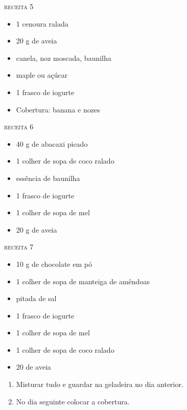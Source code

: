 {\begin{multicols}{2}
\textsc{receita 5}
\begin{itemize}
    \item 1 cenoura ralada
    \item 20 g de aveia
    \item canela, noz moscada, baunilha
    \item maple ou açúcar
    \item 1 frasco de iogurte
    \item Cobertura: banana e nozes
\end{itemize}

\textsc{receita 6}
\begin{itemize}
    \item 40 g de abacaxi picado
    \item 1 colher de sopa de coco ralado
    \item essência de baunilha
    \item 1 frasco de iogurte
    \item 1 colher de sopa de mel
    \item 20 g de aveia
\end{itemize}

\textsc{receita 7}
\begin{itemize}
    \item 10 g de chocolate em pó
    \item 1 colher de sopa de manteiga de amêndoas
    \item pitada de sal
    \item 1 frasco de iogurte
    \item 1 colher de sopa de mel
    \item 1 colher de sopa de coco ralado
    \item 20 de aveia
\end{itemize}

\end{multicols}
} {\begin{enumerate} 
    \item Misturar tudo e guardar na geladeira no dia anterior. 
    \item No dia seguinte colocar a cobertura. 
\end{enumerate} } 


